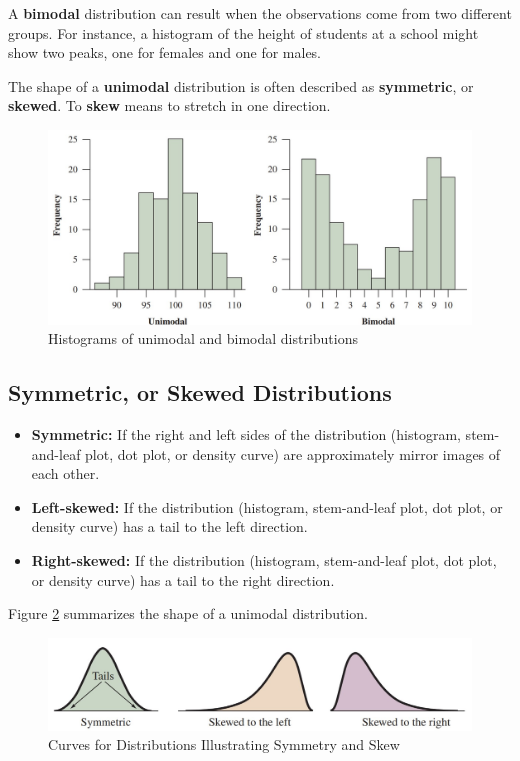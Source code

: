 A \textbf{bimodal} distribution can result when the observations come from two different groups. For instance, a histogram of the height of students at a school might show two peaks, one for females and one for males.

The shape of a \textbf{unimodal} distribution is often described as \textbf{symmetric}, or \textbf{skewed}. To \textbf{skew} means to stretch in one direction.

\begin{figure}[h!]
\centering
\includegraphics[width=1\textwidth]{figures/unimodal_bimodal.jpg}
\caption{Histograms of unimodal and bimodal distributions}
\label{fig:unimodal_bimodal.jpg}
\end{figure}

\subsection{Symmetric, or Skewed Distributions}

\begin{itemize}
    \item \textbf{Symmetric:} If the right and left sides of the distribution (histogram, stem-and-leaf plot, dot plot, or density curve) are approximately mirror images of each other.
    \item \textbf{Left-skewed:} If the distribution (histogram, stem-and-leaf plot, dot plot, or density curve) has a tail to the left direction.
    \item \textbf{Right-skewed:} If the distribution (histogram, stem-and-leaf plot, dot plot, or density curve) has a tail to the right direction.
\end{itemize}

Figure \ref{fig:shape.jpg} summarizes the shape of a unimodal distribution.

\begin{figure}[h!]
\centering
\includegraphics[width=1\textwidth]{figures/shape.jpg}
\caption{Curves for Distributions Illustrating Symmetry and Skew}
\label{fig:shape.jpg}
\end{figure}

